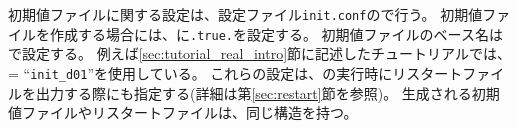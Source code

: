 初期値ファイルに関する設定は、設定ファイル\verb|init.conf|ので行う。
%
初期値ファイルを作成する場合には、に\verb|.true.|を設定する。
初期値ファイルのベース名はで設定する。
例えば\ref{sec:tutorial_real_intro}節に記述したチュートリアルでは、 = ``\verb|init_d01|''を使用している。
これらの設定は、\scalerm の実行時にリスタートファイルを出力する際にも指定する(詳細は第\ref{sec:restart}節を参照)。
生成される初期値ファイルやリスタートファイルは、同じ構造を持つ。


